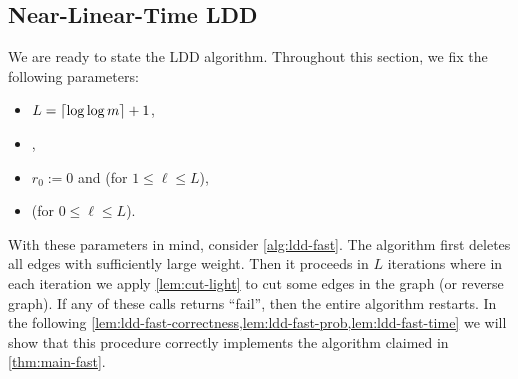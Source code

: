 \documentclass[letterpaper,11pt]{article}
\begin{document}
\subsection{Near-Linear-Time LDD} \label{sec:ldd-fast:sec:algo}
We are ready to state the LDD algorithm. Throughout this section, we fix the following parameters:
\begin{itemize}
    \item $L = \lceil\log\log m\rceil + 1$,
    \item {},
    \item $r_0 := 0$ and  (for $1 \leq \ell \leq L$),
    \item {} (for $0 \leq \ell \leq L$).
\end{itemize}
With these parameters in mind, consider \cref{alg:ldd-fast}. The algorithm first deletes all edges with sufficiently large weight. Then it proceeds in $L$ iterations where in each iteration we apply \cref{lem:cut-light} to cut some edges in the graph (or reverse graph). If any of these calls returns ``fail'', then the entire algorithm restarts. In the following \cref{lem:ldd-fast-correctness,lem:ldd-fast-prob,lem:ldd-fast-time} we will show that this procedure correctly implements the algorithm claimed in \cref{thm:main-fast}.
\end{document}
